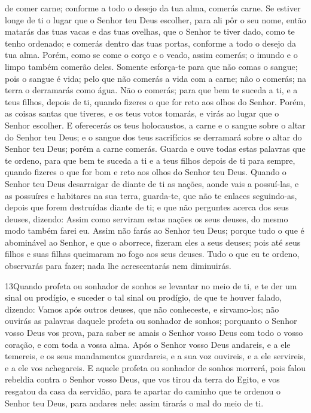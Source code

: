 de comer carne; conforme a todo o desejo da tua alma, comerás carne.
Se estiver longe de ti o lugar que o Senhor teu Deus
escolher, para ali pôr o seu nome, então matarás das tuas vacas e
das tuas ovelhas, que o Senhor te tiver dado, como te tenho
ordenado; e comerás dentro das tuas portas, conforme a todo o desejo
da tua alma. Porém, como se come o corço e o veado, assim
comerás; o imundo e o limpo também comerão deles. Somente
esforça-te para que não comas o sangue; pois o sangue é vida; pelo
que não comerás a vida com a carne; não o comerás; na terra o
derramarás como água. Não o comerás; para que bem te suceda a
ti, e a teus filhos, depois de ti, quando fizeres o que for reto aos
olhos do Senhor. Porém, as coisas santas que tiveres, e os
teus votos tomarás, e virás ao lugar que o Senhor escolher. E
oferecerás os teus holocaustos, a carne e o sangue sobre o altar do
Senhor teu Deus; e o sangue dos teus sacrifícios se derramará sobre
o altar do Senhor teu Deus; porém a carne comerás. Guarda e
ouve todas estas palavras que te ordeno, para que bem te suceda a ti
e a teus filhos depois de ti para sempre, quando fizeres o que for
bom e reto aos olhos do Senhor teu Deus. Quando o Senhor teu
Deus desarraigar de diante de ti as nações, aonde vais a possuí-las,
e as possuíres e habitares na sua terra, guarda-te, que não
te enlaces seguindo-as, depois que forem destruídas diante de ti; e
que não perguntes acerca dos seus deuses, dizendo: Assim como
serviram estas nações os seus deuses, do mesmo modo também farei eu.
Assim não farás ao Senhor teu Deus; porque tudo o que é
abominável ao Senhor, e que o aborrece, fizeram eles a seus deuses;
pois até seus filhos e suas filhas queimaram no fogo aos seus
deuses. Tudo o que eu te ordeno, observarás para fazer; nada
lhe acrescentarás nem diminuirás.

\medskip

\lettrine{13} Quando profeta ou sonhador de sonhos se levantar
no meio de ti, e te der um sinal ou prodígio, e suceder o tal
sinal ou prodígio, de que te houver falado, dizendo: Vamos após
outros deuses, que não conheceste, e sirvamo-los; não ouvirás as
palavras daquele profeta ou sonhador de sonhos; porquanto o Senhor
vosso Deus vos prova, para saber se amais o Senhor vosso Deus com
todo o vosso coração, e com toda a vossa alma. Após o Senhor
vosso Deus andareis, e a ele temereis, e os seus mandamentos
guardareis, e a sua voz ouvireis, e a ele servireis, e a ele vos
achegareis. E aquele profeta ou sonhador de sonhos morrerá, pois
falou rebeldia contra o Senhor vosso Deus, que vos tirou da terra do
Egito, e vos resgatou da casa da servidão, para te apartar do
caminho que te ordenou o Senhor teu Deus, para andares nele: assim
tirarás o mal do meio de ti.


